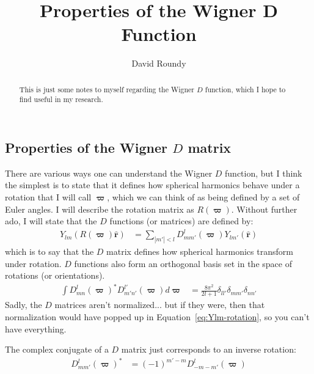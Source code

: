 \documentclass[letterpaper,twocolumn,amsmath,amssymb,pre]{revtex4-1}
\begin{document}
\title{Properties of the Wigner D Function}

\author{David Roundy}
\begin{abstract}
  This is just some notes to myself regarding the Wigner $D$ function,
  which I hope to find useful in my research.
\end{abstract}

\newcommand\rot{\ensuremath{\mathbf{\varpi}}}
\newcommand\rhat{\ensuremath{\mathbf{\hat{r}}}}
\newcommand\solidangle{\ensuremath{\Omega}}

\maketitle

\subsection{Properties of the Wigner $D$ matrix}

There are various ways one can understand the Wigner $D$ function, but
I think the simplest is to state that it defines how spherical
harmonics behave under a rotation that I will call $\rot$, which we
can think of as being defined by a set of Euler angles.  I will
describe the rotation matrix as $R(\rot)$.  Without further ado, I
will state that the $D$ functions (or matrices) are defined by:
\begin{align}\label{eq:Ylm-rotation}
  Y_{lm}(R(\rot)\rhat) &= \sum_{|m'|<l} D^{l}_{mm'}(\rot) Y_{lm'}(\rhat)
\end{align}
which is to say that the $D$ matrix defines how spherical harmonics
transform under rotation.  $D$ functions also form an orthogonal basis
set in the space of rotations (or orientations).
\begin{align}
  \int D^{l}_{mn}(\rot)^{*}D^{l'}_{m'n'}(\rot) d\rot
  &= \frac{8\pi^2}{2l+1}\delta_{ll'}\delta_{mm'}\delta_{nn'}
\end{align}
Sadly, the $D$ matrices aren't normalized... but if they were, then
that normalization would have popped up in
Equation~\ref{eq:Ylm-rotation}, so you can't have everything.

The complex conjugate of a $D$ matrix just corresponds to an inverse
rotation:
\begin{align}
  D^{l}_{mm'}(\rot)^{*} &= (-1)^{m'-m}D^{l}_{-m-m'}(\rot)
\end{align}
\end{document}
